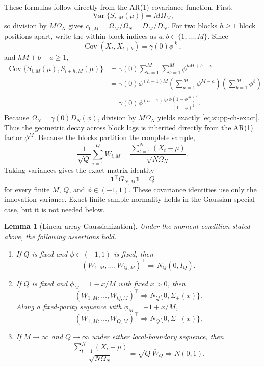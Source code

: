 \documentclass[12pt]{article}
\newtheorem{Lemma}[Proposition]{Lemma}
\theoremstyle{remark}
\begin{document}
These formulas follow directly from the AR(1) covariance function. First,
\[
\operatorname{Var}\{S_{i,M}(\mu)\}=M\Omega_M,
\]
so division by $M\Omega_N$ gives $c_{0,M}=\Omega_M/\Omega_N=D_M/D_N$. For two blocks $h\ge1$ block positions apart, write the within-block indices as $a,b\in\{1,\ldots,M\}$. Since
\[
\operatorname{Cov}(X_t,X_{t+k})=\gamma(0)\phi^{|k|},
\]
and $hM+b-a\ge1$,
\begin{align*}
\operatorname{Cov}\{S_{i,M}(\mu),S_{i+h,M}(\mu)\}
&=\gamma(0)\sum_{a=1}^M\sum_{b=1}^M\phi^{hM+b-a}\\
&=\gamma(0)\phi^{(h-1)M}
\left(\sum_{a=1}^M\phi^{M-a}\right)
\left(\sum_{b=1}^M\phi^b\right)\\
&=\gamma(0)\phi^{(h-1)M}
\frac{\phi(1-\phi^M)^2}{(1-\phi)^2}.
\end{align*}
Because $\Omega_N=\gamma(0)D_N(\phi)$, division by $M\Omega_N$ yields exactly \eqref{eq:supp-ch-exact}. Thus the geometric decay across block lags is inherited directly from the AR(1) factor $\phi^M$.
Because the blocks partition the complete sample,
\begin{equation}
\frac1{\sqrt Q}\sum_{i=1}^QW_{i,M}
=
\frac{\sum_{t=1}^N(X_t-\mu)}{\sqrt{N\Omega_N}}.
\label{eq:supp-exact-mean-identity}
\end{equation}
Taking variances gives the exact matrix identity
\begin{equation}
\mathbf1^\top G_{N,M}\mathbf1=Q
\label{eq:supp-exact-G-identity}
\end{equation}
for every finite $M$, $Q$, and $\phi\in(-1,1)$. These covariance identities use only the innovation variance. Exact finite-sample normality holds in the Gaussian special case, but it is not needed below.

\begin{Lemma}[Linear-array Gaussianization]
\label{lem:supp-boundary-linear-clt}
Under the moment condition stated above, the following assertions hold.
\begin{enumerate}[label=(\roman*),leftmargin=*]
\item If $Q$ is fixed and $\phi\in(-1,1)$ is fixed, then
\[
(W_{1,M},\ldots,W_{Q,M})^\top\Rightarrow N_Q(0,I_Q).
\]
\item If $Q$ is fixed and $\phi_M=1-x/M$ with fixed $x>0$, then
\[
(W_{1,M},\ldots,W_{Q,M})^\top\Rightarrow N_Q\{0,\Sigma_+(x)\}.
\]
Along a fixed-parity sequence with $\phi_M=-1+x/M$,
\[
(W_{1,M},\ldots,W_{Q,M})^\top\Rightarrow N_Q\{0,\Sigma_-(x)\}.
\]
\item If $M\to\infty$ and $Q\to\infty$ under either local-boundary sequence, then
\[
\frac{\sum_{t=1}^N(X_t-\mu)}{\sqrt{N\Omega_N}}
=\sqrt Q\,\bar W_Q
\Rightarrow N(0,1).
\]
\end{enumerate}
\end{Lemma}
\end{document}
